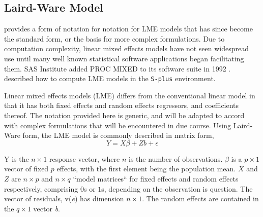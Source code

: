 \documentclass[12pt, a4paper]{report}
\theoremstyle{plain}
\theoremstyle{definition}
\theoremstyle{remark}
\begin{document}
\subsection{Laird-Ware Model} 
\citet{LW82} provides a form of notation for notation for LME models that has since become the standard form, or the basis for more complex formulations. Due to computation complexity, linear mixed effects models have not seen widespread use until many well known statistical software applications began facilitating them. SAS Institute added PROC MIXED to its software suite in 1992 \citep{singer}. \citet{PB} described how to compute LME models in the \texttt{S-plus} environment.

Linear mixed effects models (LME)
differs from the conventional linear model in that it has both
fixed effects and random effects regressors, and coefficients
thereof. The notation provided here is generic, and will be adapted to accord with complex formulations that will be encountered in due course. Using Laird-Ware form, the LME model is commonly described in matrix form,
\begin{equation}
Y = X\beta + Zb + \epsilon
\label{LW}
\end{equation}

Y is the $n \times 1$ response vector, where  $n$ is the number of observations. \textit{$\beta$} is a $p \times 1$ vector of fixed $p$ effects, with the
first element being the population mean. $X$ and $Z$ are $n \times p$ and $n \times q$ ``model matrices`` for fixed effects and random effects respectively, comprising
$0$s or $1$s, depending on the observation is question. The vector of residuals, v(\textit{e}) has
dimension $n \times 1$. The random effects are contained in the  $q \times
1$ vector \textit{b}.



\end{document}
